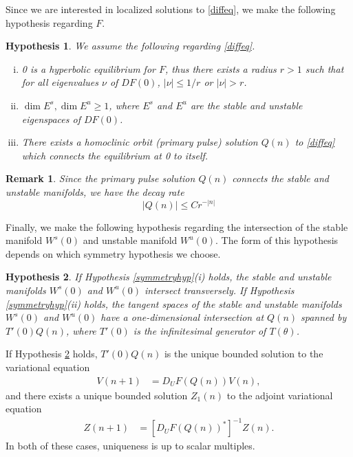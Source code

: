 \documentclass[12pt]{article}
\newtheorem{hypothesis}{Hypothesis}
\newtheorem{remark}{Remark}
\begin{document}
Since we are interested in localized solutions to \eqref{diffeq}, we make the following hypothesis regarding $F$.

\begin{hypothesis}\label{initialhyp}
We assume the following regarding \eqref{diffeq}.
\begin{enumerate}[(i)]
\item 0 is a hyperbolic equilibrium for $F$, thus there exists a radius $r > 1$ such that for all eigenvalues $\nu$ of $DF(0)$, $|\nu| \leq 1/r$ or $|\nu| > r$.
\item $\dim E^s, \dim E^u \geq 1$, where $E^s$ and $E^u$ are the stable and unstable eigenspaces of $DF(0)$.
\item There exists a homoclinic orbit (primary pulse) solution $Q(n)$ to \eqref{diffeq} which connects the equilibrium at 0 to itself.
\end{enumerate}
\end{hypothesis}

\begin{remark}\label{Qdecay}
Since the primary pulse solution $Q(n)$ connects the stable and unstable manifolds, we have the decay rate
\[
|Q(n)| \leq C r^{-|n|}
\]
\end{remark}

Finally, we make the following hypothesis regarding the intersection of the stable manifold $W^s(0)$ and unstable manifold $W^u(0)$. The form of this hypothesis depends on which symmetry hypothesis we choose.

\begin{hypothesis}\label{intersectionhyp}
If Hypothesis \ref{symmetryhyp}(i) holds, the stable and unstable manifolds $W^s(0)$ and $W^u(0)$ intersect transversely. If Hypothesis \ref{symmetryhyp}(ii) holds, the tangent spaces of the stable and unstable manifolds $W^s(0)$ and $W^u(0)$ have a one-dimensional intersection at $Q(n)$ spanned by $T'(0) Q(n)$, where $T'(0)$ is the infinitesimal generator of $T(\theta)$.
\end{hypothesis}

If Hypothesis \ref{intersectionhyp} holds, $T'(0) Q(n)$ is the unique bounded solution to the variational equation
\begin{align*}
V(n+1) &= D_U F(Q(n)) V(n),
\end{align*}
and there exists a unique bounded solution $Z_1(n)$ to the adjoint variational equation
\begin{align*}
Z(n+1) &= [D_U F(Q(n))^*]^{-1} Z(n).
\end{align*}
In both of these cases, uniqueness is up to scalar multiples.
\end{document}

